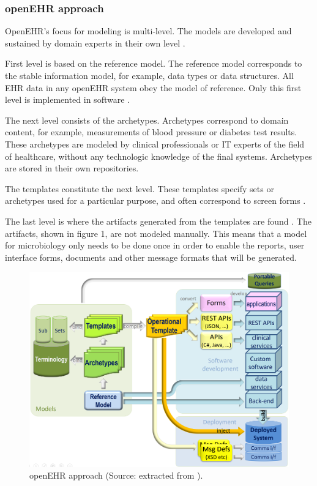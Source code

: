 \subsubsection{openEHR approach}

OpenEHR's focus for modeling is multi-level. The models are developed and sustained by domain experts in their own level \cite{openEHRArchitecture}.

First level is based on the reference model. The reference model corresponds to the stable information model, for example, data types or data structures. All EHR data in any openEHR system obey the model of reference. Only this first level is implemented in software \cite{openEHRArchitecture}.

The next level consists of the archetypes. Archetypes correspond to domain content, for example, measurements of blood pressure or diabetes test results. These archetypes are modeled by clinical professionals or IT experts of the field of healthcare, without any technologic knowledge of the final systems. Archetypes are stored in their own repositories.

The templates constitute the next level. These templates specify sets or archetypes used for a particular purpose, and often correspond to screen forms \cite{openEHRArchitecture}.

The last level is where the artifacts generated from the templates are found \cite{openEHR}. The artifacts, shown in figure 1, are not modeled manually. This means that a model for microbiology only needs to be done once in order to enable the reports, user interface forms, documents and other message formats that will be generated.

\begin{figure}[h]
  \centering
  \includegraphics[scale=0.6]{./images/openehr_dev_ecosystem}
  \caption{openEHR approach (Source: extracted from \cite{openEHR}).}
  \label{fig:openeEHR_ecosystem}
\end{figure}
